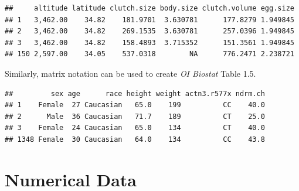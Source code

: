 \begin{knitrout}
\color{fgcolor}\begin{kframe}
\begin{alltt}
 \hlkwb{=} \hlstd{frog.altitude.data[}\hlstd{(}\hlopt{:}\hlstd{,} \hlstd{),]}
\end{alltt}
\begin{verbatim}
##     altitude latitude clutch.size body.size clutch.volume egg.size
## 1   3,462.00    34.82    181.9701  3.630781      177.8279 1.949845
## 2   3,462.00    34.82    269.1535  3.630781      257.0396 1.949845
## 3   3,462.00    34.82    158.4893  3.715352      151.3561 1.949845
## 150 2,597.00    34.05    537.0318        NA      776.2471 2.238721
\end{verbatim}
\end{kframe}
\end{knitrout}

Similarly, matrix notation can be used to create \textit{OI Biostat} Table 1.5.

\begin{knitrout}
\color{fgcolor}\begin{kframe}
\begin{alltt}
\hlstd{famuss[}\hlstd{(}\hlstd{,}\hlstd{,}\hlstd{,}\hlstd{),}\hlstd{(} \hlstd{,} \hlstd{,} \hlstd{,} \hlstd{,} \hlstd{,} \hlstd{,}
                       \hlstd{)]}
\end{alltt}
\begin{verbatim}
##         sex age      race height weight actn3.r577x ndrm.ch
## 1    Female  27 Caucasian   65.0    199          CC    40.0
## 2      Male  36 Caucasian   71.7    189          CT    25.0
## 3    Female  24 Caucasian   65.0    134          CT    40.0
## 1348 Female  30 Caucasian   64.0    134          CC    43.8
\end{verbatim}
\end{kframe}
\end{knitrout}

\section{Numerical Data}

